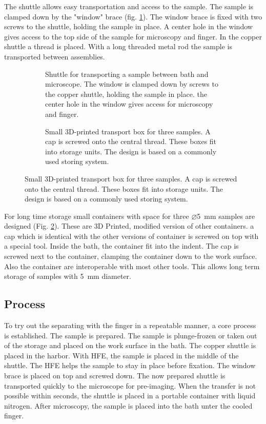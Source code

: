 The shuttle allows easy transportation and access to the sample. The sample is clamped down by the "window" brace (fig. \ref{fig:shuttle}). The window brace is fixed with two screws to the shuttle, holding the sample in place. A center hole in the window gives access to the top side of the sample for microscopy and finger. In the copper shuttle a thread is placed. With a long threaded metal rod the sample is transported between assemblies.

\begin{figure}[hbt!]
	\centering
	\begin{subfigure}[]{0.45\textwidth}
		\centering
		
		\caption{Shuttle for transporting a sample between bath and microscope. The window is clamped down by screws to the copper shuttle, holding the sample in place. the center hole in the window gives access for microscopy and finger.}
		\label{fig:shuttle}
	\end{subfigure}
	\begin{subfigure}[]{0.45\textwidth}
		\centering
		
		\caption{Small 3D-printed transport box for three samples. A cap is screwed onto the central thread. These boxes fit into storage units. The design is based on a commonly used storing system.\newline\newline}
		\label{fig:transportbox}
	\end{subfigure}
	\label{fig:shuttleandtransportbox}
\end{figure}

For long time storage small containers with space for three $\varnothing$\SI{5}{\milli\meter} samples are designed (Fig. \ref{fig:transportbox}). These are 3D Printed, modified version of other containers. a cap which is identical with the other versions of container is screwed on top with a special tool. Inside the bath, the container fit into the indent. The cap is screwed next to the container, clamping the container down to the work surface. Also the container are interoperable with most other tools. This allows long term storage of samples with \SI{5}{\milli\meter} diameter.

\FloatBarrier

\subsection{Process}
\label{section:Process}

To try out the separating with the finger in a repeatable manner, a core process is established. The sample is prepared. The sample is plunge-frozen or taken out of the storage and placed on the work surface in the bath. The copper shuttle is placed in the harbor. With HFE, the sample is placed in the middle of the shuttle. The HFE helps the sample to stay in place before fixation. The window brace is placed on top and screwed down. The now prepared shuttle is transported quickly to the microscope for pre-imaging. When the transfer is not possible within seconds, the shuttle is placed in a portable container with liquid nitrogen. After microscopy, the sample is placed into the bath unter the cooled finger. 

